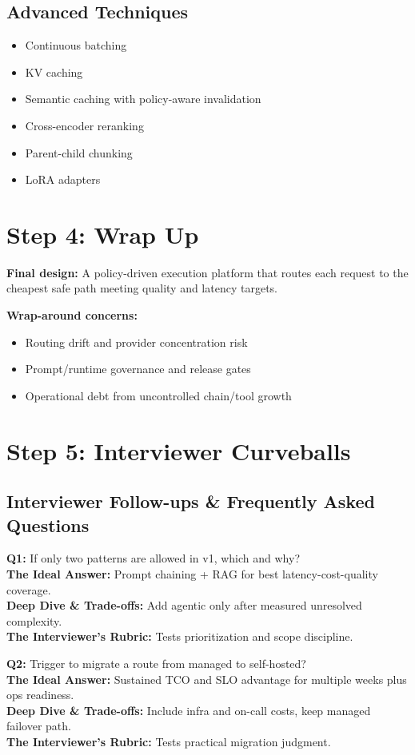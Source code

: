 \subsection*{Advanced Techniques}
\begin{itemize}
  \item Continuous batching
  \item KV caching
  \item Semantic caching with policy-aware invalidation
  \item Cross-encoder reranking
  \item Parent-child chunking
  \item LoRA adapters
\end{itemize}

\section*{Step 4: Wrap Up}
\textbf{Final design:} A policy-driven execution platform that routes each request to the cheapest safe path meeting quality and latency targets.

\textbf{Wrap-around concerns:}
\begin{itemize}
  \item Routing drift and provider concentration risk
  \item Prompt/runtime governance and release gates
  \item Operational debt from uncontrolled chain/tool growth
\end{itemize}

\section*{Step 5: Interviewer Curveballs}
\subsection*{Interviewer Follow-ups \& Frequently Asked Questions}
\textbf{Q1:} If only two patterns are allowed in v1, which and why?\\
\textbf{The Ideal Answer:} Prompt chaining + RAG for best latency-cost-quality coverage.\\
\textbf{Deep Dive \& Trade-offs:} Add agentic only after measured unresolved complexity.\\
\textbf{The Interviewer's Rubric:} Tests prioritization and scope discipline.

\textbf{Q2:} Trigger to migrate a route from managed to self-hosted?\\
\textbf{The Ideal Answer:} Sustained TCO and SLO advantage for multiple weeks plus ops readiness.\\
\textbf{Deep Dive \& Trade-offs:} Include infra and on-call costs, keep managed failover path.\\
\textbf{The Interviewer's Rubric:} Tests practical migration judgment.

